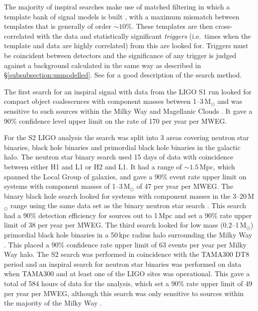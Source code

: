 \documentclass{article}
\begin{document}
The majority of inspiral searches make use of matched filtering in which a
template bank of signal models is built \cite{Owen:1996, Owen:1999}, with a
maximum mismatch between templates that is generally of order $\sim10\%$. These
templates are then cross-correlated with the data and statistically significant
{\it triggers} (i.e.\ times when the template and data are highly correlated)
from this are looked for. Triggers must be coincident between detectors and the
significance of any trigger is judged against a background calculated in the
same way as described in \S\ref{subsubsection:unmodelled}. See
\cite{Abbott:2005b} for a good description of the search method.

The first search for an inspiral signal with data from the LIGO S1 run looked
for compact object coalescences with component masses between 1--3\,M$_{\odot}$
and was sensitive to such sources within the Milky Way and Magellanic Clouds
\cite{Abbott:2004c}. It gave a 90\% confidence level upper limit on the rate of
170 per year per MWEG.

For the S2 LIGO analysis the search was split into 3 areas covering neutron star
binaries, black hole binaries and primordial black hole binaries in the galactic
halo. The neutron star binary search \cite{Abbott:2005b} used 15 days of data
with coincidence between either H1 and L1 or H2 and L1. It had a range of
$\sim1.5$\,Mpc, which spanned the Local Group of galaxies, and gave a 90\% event
rate upper limit on systems with component masses of 1--3\,M$_{\odot}$ of 47 per
year per MWEG. The binary black hole search looked for systems with component
masses in the 3--20\,M$_{\odot}$ range using the same data set as the binary
neutron star search \cite{Abbott:2006a}. This search had a 90\% detection
efficiency for sources out to 1\,Mpc and set a 90\% rate upper limit of 38 per
year per MWEG. The third search looked for low mass (0.2--1\,M$_{\odot}$)
primordial black hole binaries in a 50\,kpc radius halo surrounding the Milky
Way \cite{Abbott:2005e}. This placed a 90\% confidence rate upper limit of 63
events per year per Milky Way halo. The S2 search was performed in coincidence
with the TAMA300 DT8 period and an inspiral search for neutron star binaries
was
performed on data when TAMA300 and at least one of the LIGO sites was
operational. This gave a total of 584 hours of data for the analysis, which set
a 90\% rate upper limit of 49 per year per MWEG, although this search was only
sensitive to sources within the majority of the Milky Way \cite{Abbott:2006b}.
\end{document}
